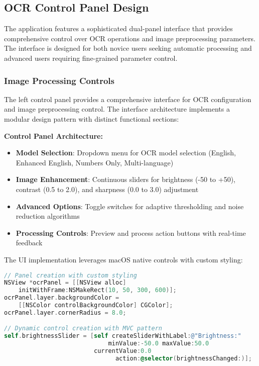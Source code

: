 \subsection{OCR Control Panel Design}

The application features a sophisticated dual-panel interface that provides comprehensive control over OCR operations and image preprocessing parameters. The interface is designed for both novice users seeking automatic processing and advanced users requiring fine-grained parameter control.

\subsubsection{Image Processing Controls}

The left control panel provides a comprehensive interface for OCR configuration and image preprocessing control. The interface architecture implements a modular design pattern with distinct functional sections:

\textbf{Control Panel Architecture:}
\begin{itemize}
\item \textbf{Model Selection}: Dropdown menu for OCR model selection (English, Enhanced English, Numbers Only, Multi-language)
\item \textbf{Image Enhancement}: Continuous sliders for brightness (-50 to +50), contrast (0.5 to 2.0), and sharpness (0.0 to 3.0) adjustment
\item \textbf{Advanced Options}: Toggle switches for adaptive thresholding and noise reduction algorithms
\item \textbf{Processing Controls}: Preview and process action buttons with real-time feedback
\end{itemize}

The UI implementation leverages macOS native controls with custom styling:

\begin{lstlisting}[language=C,basicstyle=\footnotesize\ttfamily,frame=single,breaklines=true,columns=flexible]
// Panel creation with custom styling
NSView *ocrPanel = [[NSView alloc] 
    initWithFrame:NSMakeRect(10, 50, 300, 600)];
ocrPanel.layer.backgroundColor = 
    [[NSColor controlBackgroundColor] CGColor];
ocrPanel.layer.cornerRadius = 8.0;

// Dynamic control creation with MVC pattern
self.brightnessSlider = [self createSliderWithLabel:@"Brightness:" 
                             minValue:-50.0 maxValue:50.0 
                         currentValue:0.0 
                               action:@selector(brightnessChanged:)];
\end{lstlisting}

